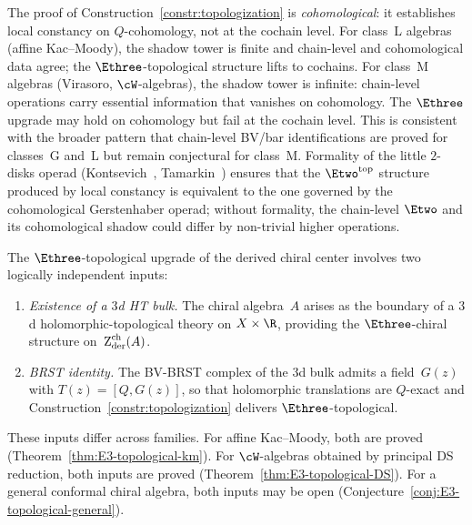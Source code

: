 \begin{remark}
\label{rem:cohomological-vs-cochain}
The proof of Construction~\ref{constr:topologization} is
\emph{cohomological}: it establishes local constancy on
$Q$-cohomology, not at the cochain level.
For class~L algebras (affine Kac--Moody), the
shadow tower is finite and chain-level and cohomological
data agree; the $\Ethree$-topological structure lifts to
cochains.
For class~M algebras (Virasoro, $\cW$-algebras), the
shadow tower is infinite: chain-level operations carry
essential information that vanishes on cohomology.
The $\Ethree$ upgrade may hold on cohomology but fail at the
cochain level. This is consistent with the broader pattern
that chain-level BV/bar identifications are proved for
classes~G and~L but remain conjectural for class~M.
Formality of the little $2$-disks operad
(Kontsevich~\cite{Kon03}, Tamarkin~\cite{Tamarkin00})
ensures that the $\Etwo^{\mathrm{top}}$ structure produced
by local constancy is equivalent to the one governed
by the cohomological Gerstenhaber operad; without formality,
the chain-level $\Etwo$ and its cohomological shadow could
differ by non-trivial higher operations.
\end{remark}

\label{conj:E3-topological-climax}

\begin{remark}
\label{rem:E3-topological-separation}
The $\Ethree$-topological upgrade of the derived chiral center
involves two logically independent inputs:
\begin{enumerate}[label=\textup{(\alph*)}]
\item\label{item:E3-existence}
 \emph{Existence of a $3$d HT bulk.}
 The chiral algebra~$A$ arises as the boundary of a $3$d
 holomorphic-topological theory on $X \times \R$, providing
 the $\Ethree$-chiral structure on~$\operatorname{Z}_{\mathrm{der}}^{\mathrm{ch}}(A)$.
\item\label{item:E3-brst}
 \emph{BRST identity.}
 The BV-BRST complex of the $3$d bulk admits a field~$G(z)$
 with $T(z) = [Q, G(z)]$, so that holomorphic translations
 are $Q$-exact and
 Construction~\textup{\ref{constr:topologization}} delivers
 $\Ethree$-topological.
\end{enumerate}
These inputs differ across families.
For affine Kac--Moody, both are proved
\textup{(}Theorem~\textup{\ref{thm:E3-topological-km}}\textup{)}.
For $\cW$-algebras obtained by principal DS reduction, both inputs
are proved
\textup{(}Theorem~\textup{\ref{thm:E3-topological-DS}}\textup{)}.
For a general conformal chiral algebra, both inputs may be open
\textup{(}Conjecture~\textup{\ref{conj:E3-topological-general}}\textup{)}.
\end{remark}

